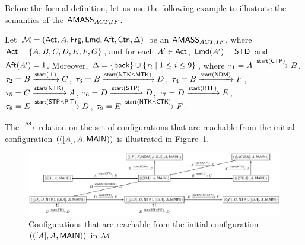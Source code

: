 Before the formal definition, let us use the following example to illustrate the semantics of the $\textsf{AMASS}_{ACT,IF}$. 
%
\begin{example}\label{exam:ifo-amass}
    Let ${\mathcal{M} } = ({\sf Act}, A, {\sf Frg}, {\sf Lmd}, {\sf Aft}, {\sf Ctn}, \Delta)$ be an $\textsf{AMASS}_{ACT,IF}$, where ${\sf Act} = \{A,B,C,D,E,F,G\}$, and for each $A' \in{\sf Act}$, ${\sf Lmd}(A') = {\sf STD}$ and ${\sf Aft}(A') = 1$.
    Moreover, $\Delta = \{{\mathsf{back} }\} \cup \{\tau_i \mid 1 \le i \le 9\}$, where 
        $\tau_1 = A\xrightarrow{{\mathsf{start} }({\sf CTP})}B$,
        $\tau_2 = B\xrightarrow{{\mathsf{start} }(\bot)}C$,
        $\tau_3 = B\xrightarrow{{\mathsf{start} }({\sf NTK}\wedge{\sf MTK})}D$,
        $\tau_4 = B\xrightarrow{{\mathsf{start} }({\sf NDM})}F$,
        $\tau_5 = C\xrightarrow{{\mathsf{start} }({\sf NTK})}A$,
        $\tau_6 = D\xrightarrow{{\mathsf{start} }({\sf STP})}D$,
        $\tau_7 = D\xrightarrow{{\mathsf{start} }({\sf RTF})}E$,
        $\tau_8 = E\xrightarrow{{\mathsf{start} }({\sf STP}\wedge{\sf PIT})}D$,
        $\tau_9 = E\xrightarrow{{\mathsf{start} }({\sf NTK}\wedge{\sf CTK})}F$.

        The $\xrightarrow{{\mathcal{M} }}$ relation on the set of configurations that are reachable from the initial configuration $(([A], A, {\sf MAIN}))$ is illustrated in Figure~\ref{ifo-example}. 
%
    \begin{figure}[htbp]
            \centering
            \includegraphics[scale = 0.63]{ifo-example.pdf}
        \caption{Configurations that are reachable from the initial configuration $(([A], A, {\sf MAIN}))$ in ${\mathcal{M} }$}
        \label{ifo-example}
    \end{figure}
    

\end{example}
